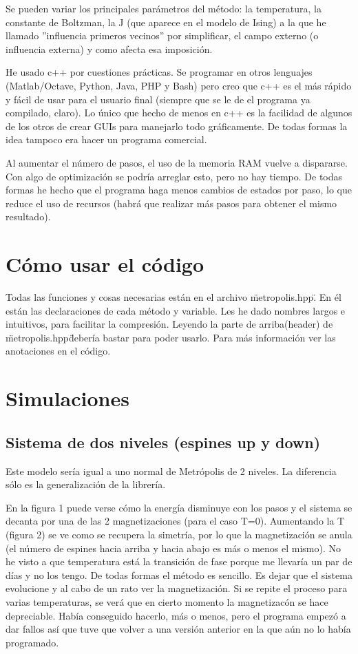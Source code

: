 \documentclass[a4paper,10pt,twocolumn]{article}
\begin{document}
Se pueden variar los principales par\'ametros del m\'etodo: la temperatura, la constante de Boltzman, la J (que aparece en el modelo de Ising) a la que he llamado ''influencia primeros vecinos'' por simplificar, el campo externo (o influencia externa) y como afecta esa imposici\'on.

He usado c++ por cuestiones pr\'acticas. Se programar en otros lenguajes (Matlab/Octave, Python, Java, PHP y Bash) pero creo que c++ es el m\'as r\'apido y f\'acil de usar para el usuario final (siempre que se le de el programa ya compilado, claro). Lo \'unico que hecho de menos en c++ es la facilidad de algunos de los otros de crear GUIs para manejarlo todo gr\'aficamente. De todas formas la idea tampoco era hacer un programa comercial. 

Al aumentar el n\'umero de pasos, el uso de la memoria RAM vuelve a dispararse. Con algo de optimizaci\'on se podr\'ia arreglar esto, pero no hay tiempo. De todas formas he hecho que el programa haga menos cambios de estados por paso, lo que reduce el uso de recursos (habr\'a que realizar m\'as pasos para obtener el mismo resultado).

\section*{C\'omo usar el c\'odigo}

Todas las funciones y cosas necesarias est\'an en el archivo \"metropolis.hpp\". En \'el est\'an las declaraciones de cada m\'etodo y variable. Les he dado nombres largos e intuitivos, para facilitar la compresi\'on. Leyendo la parte de arriba(header) de \"metropolis.hpp\" deber\'ia bastar para poder usarlo. Para m\'as informaci\'on ver las anotaciones en el c\'odigo.

\section*{Simulaciones}
\subsection*{Sistema de dos niveles (espines up y down)}

Este modelo ser\'ia igual a uno normal de Metr\'opolis de 2 niveles. La diferencia s\'olo es la generalizaci\'on de la librer\'ia.

En la figura 1 puede verse c\'omo la energ\'ia disminuye con los pasos y el sistema se decanta por una de las 2 magnetizaciones (para el caso T=0). Aumentando la T (figura 2) se ve como se recupera la simetr\'ia, por lo que la magnetizaci\'on se anula (el n\'umero de espines hacia arriba y hacia abajo es m\'as o menos el mismo). No he visto a que temperatura est\'a la transici\'on de fase porque me llevar\'ia un par de d\'ias y no los tengo. De todas formas el m\'etodo es sencillo. Es dejar que el sistema evolucione y al cabo de un rato ver la magnetizaci\'on. Si se repite el proceso para varias temperaturas, se ver\'a que en cierto momento la magnetizac\'on se hace depreciable. Hab\'ia conseguido hacerlo, m\'as o menos, pero el programa empez\'o a dar fallos as\'i que tuve que volver a una versi\'on anterior en la que a\'un no lo hab\'ia programado.
\end{document}
